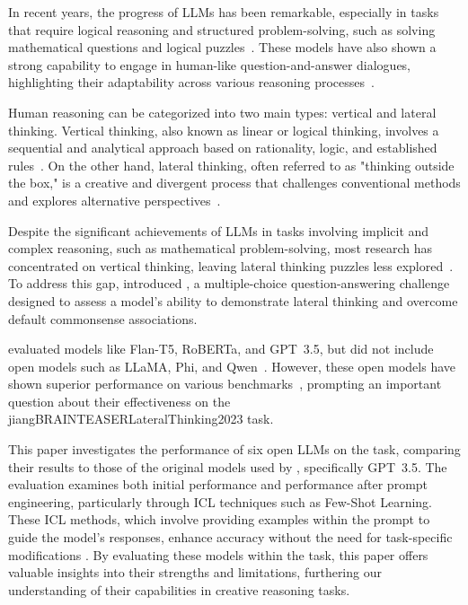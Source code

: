 In recent years, the progress of \acp{LLM} has been remarkable, especially in tasks that require logical reasoning and structured problem-solving, such as solving mathematical questions and logical puzzles~\cite{panLogicLMEmpoweringLarge2023,zebazeTreeProblemsImproving2024,yuFlowReasoningTraining2025}. These models have also shown a strong capability to engage in human-like question-and-answer dialogues, highlighting their adaptability across various reasoning processes~\cite{haoRecentProgressLeveraging2022, panLogicLMEmpoweringLarge2023,zebazeTreeProblemsImproving2024,yuFlowReasoningTraining2025}.

Human reasoning can be categorized into two main types: vertical and lateral thinking. Vertical thinking, also known as linear or logical thinking, involves a sequential and analytical approach based on rationality, logic, and established rules~\cite{jiangBRAINTEASERLateralThinking2023}. On the other hand, lateral thinking, often referred to as "thinking outside the box," is a creative and divergent process that challenges conventional methods and explores alternative perspectives~\cite{jiangBRAINTEASERLateralThinking2023}.

Despite the significant achievements of \acp{LLM} in tasks involving implicit and complex reasoning, such as mathematical problem-solving, most research has concentrated on vertical thinking, leaving lateral thinking puzzles less explored~\cite{jiangBRAINTEASERLateralThinking2023,chenWeakevalStrongEvaluatingEliciting2024,huangLatEvalInteractiveLLMs2024}. To address this gap, \textcite{jiangBRAINTEASERLateralThinking2023} introduced , a multiple-choice question-answering challenge designed to assess a model's ability to demonstrate lateral thinking and overcome default commonsense associations.

\textcite{jiangBRAINTEASERLateralThinking2023} evaluated models like Flan-T5, RoBERTa, and \acs{GPT}~3.5, but did not include open models such as \acs{LLaMA}, \acs{Phi}, and \acs{Qwen}~\cite{jiangBRAINTEASERLateralThinking2023}. However, these open
models have shown superior performance on various benchmarks~\cite{OpenLLMLeaderboard},
prompting an important question about their effectiveness on the \citetitle
{jiangBRAINTEASERLateralThinking2023} task.

This paper investigates the performance of six open \acp{LLM} on the  task, comparing their results to those of the original models used by \textcite{jiangBRAINTEASERLateralThinking2023}, specifically \acs{GPT}~3.5. The evaluation examines both initial performance and performance after prompt engineering, particularly through \ac{ICL} techniques such as Few-Shot Learning. These \ac{ICL} methods, which involve providing examples within the prompt to guide the model’s responses, enhance accuracy without the need for task-specific modifications \cite{yinDeeperInsightsUpdates2024,brownLanguageModelsAre2020}. By evaluating these models within the  task, this paper offers valuable insights into their strengths and limitations, furthering our understanding of their capabilities in creative reasoning tasks.
